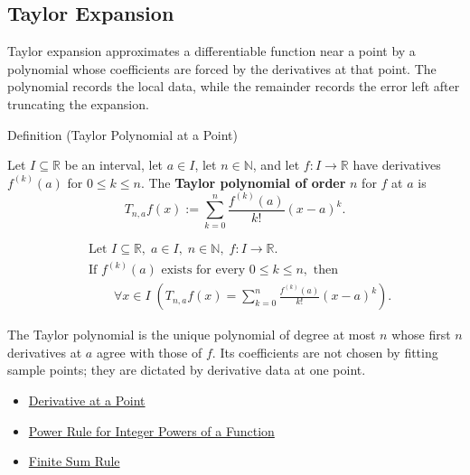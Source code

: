 \subsection*{Taylor Expansion}
\begin{exposition}
Taylor expansion approximates a differentiable function near a point by a
polynomial whose coefficients are forced by the derivatives at that point.
The polynomial records the local data, while the remainder records the error
left after truncating the expansion.
\end{exposition}


\begin{definitionbox}{Definition (Taylor Polynomial at a Point)}
\begin{definition}
\label{def:taylor-polynomial-at-a-point}
Let $I\subseteq\mathbb{R}$ be an interval, let $a\in I$, let
$n\in\mathbb{N}$, and let $f:I\to\mathbb{R}$ have derivatives
$f^{(k)}(a)$ for $0\le k\le n$. The \textbf{Taylor polynomial of order}
$n$ for $f$ at $a$ is
\[
  T_{n,a}f(x)
  :=
  \sum_{k=0}^{n}\frac{f^{(k)}(a)}{k!}(x-a)^k.
\]
\end{definition}
\end{definitionbox}

\begin{remark*}
\[
\begin{aligned}
&\text{Let } I\subseteq\mathbb{R},\; a\in I,\; n\in\mathbb{N},\;
f:I\to\mathbb{R}.\\
&\text{If } f^{(k)}(a)\text{ exists for every }0\le k\le n,\text{ then}\\
&\qquad
\forall x\in I\;
\left(
  T_{n,a}f(x)=\sum_{k=0}^{n}\frac{f^{(k)}(a)}{k!}(x-a)^k
\right).
\end{aligned}
\]
\end{remark*}

\begin{remark*}[Interpretation]
The Taylor polynomial is the unique polynomial of degree at most $n$ whose
first $n$ derivatives at $a$ agree with those of $f$. Its coefficients are
not chosen by fitting sample points; they are dictated by derivative data at
one point.
\end{remark*}

\begin{dependencies}
\begin{itemize}
  \item \hyperref[def:derivative-at-a-point]{Derivative at a Point}
  \item \hyperref[cor:power-rule-special-case]{Power Rule for Integer Powers of a Function}
  \item \hyperref[cor:finite-sum-rule]{Finite Sum Rule}
\end{itemize}
\end{dependencies}

